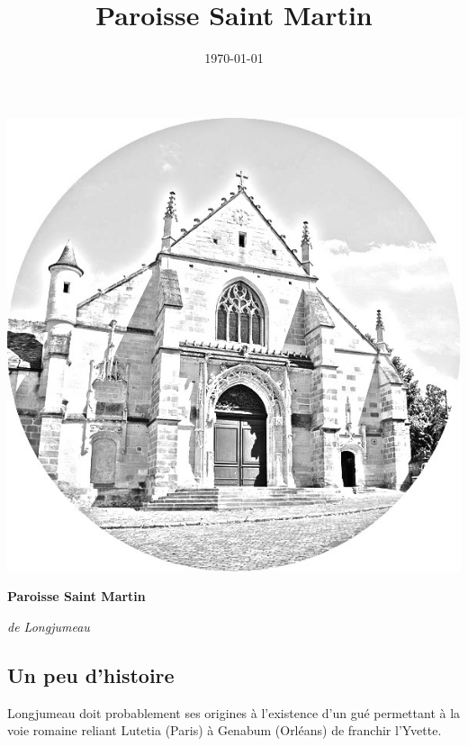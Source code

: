 \documentclass[a5paper, 9pt]{extarticle}
\title{Paroisse Saint Martin}
\date{\today}
\begin{document}
\noindent
\begin{minipage}[t]{0.4\textwidth}
    \includegraphics[width=\linewidth]{images/eglise_rond.jpg} %
\end{minipage}%
\begin{minipage}[t]{0.55\textwidth}
    \vspace{-3cm} %
    \centering
    {\Huge \bfseries Paroisse Saint Martin \par}

    \vspace{0.3cm} %

    {\Huge \itshape de Longjumeau \par}
\end{minipage}


\subsection*{Un peu d'histoire}

Longjumeau doit probablement ses origines à l'existence d'un gué
permettant à la voie romaine reliant Lutetia (Paris) à Genabum
(Orléans) de franchir l'Yvette.
\end{document}
